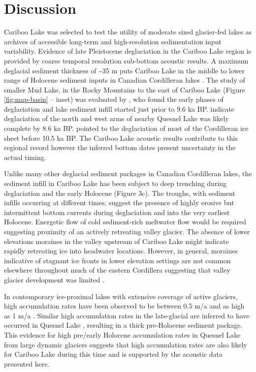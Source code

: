 \documentclass[Royal,times,doublespace,sageh]{sagej}
\begin{document}
\hypertarget{discussion}{%
\section{Discussion}\label{discussion}}

Cariboo Lake was selected to test the utility of moderate sized
glacier-fed lakes as archives of accessible long-term and
high-resolution sedimentation input variability. Evidence of late
Pleistocene deglaciation in the Cariboo Lake region is provided by
coarse temporal resolution sub-bottom acoustic results. A maximum
deglacial sediment thickness of \textasciitilde35 m puts Cariboo Lake in
the middle to lower range of Holocene sediment inputs in Canadian
Cordilleran lakes \citep[see detailed discussion in][]{Gilbert2012}. The
study of smaller Mud Lake, in the Rocky Mountains to the east of Cariboo
Lake (Figure \ref{fig:map-basin} -- inset) was evaluated by
\citet{Hodder2006b}, who found the early phases of deglaciation and lake
sediment infill started just prior to 9.6 ka BP. \citet{Gilbert2012}
indicate deglaciation of the north and west arms of nearby Quesnel Lake
was likely complete by 8.6 ka BP. \citet{Menounos2009b} pointed to the
deglaciation of most of the Cordilleran ice sheet before 10.5 ka BP. The
Cariboo Lake acoustic results contribute to this regional record however
the inferred bottom dates present uncertainty in the actual timing.

Unlike many other deglacial sediment packages in Canadian Cordilleran
lakes, the sediment infill in Cariboo Lake has been subject to deep
trenching during deglaciation and the early Holocene (Figure 3c). The
troughs, with sediment infills occurring at different times, suggest the
presence of highly erosive but intermittent bottom currents during
deglaciation and into the very earliest Holocene. Energetic flow of cold
sediment-rich meltwater flow would be required suggesting proximity of
an actively retreating valley glacier. The absence of lower elevations
moraines in the valley upstream of Cariboo Lake might indicate rapidly
retreating ice into headwater locations. However, in general, moraines
indicative of stagnant ice fronts in lower elevation settings are not
common elsewhere throughout much of the eastern Cordillera suggesting
that valley glacier development was limited \citep{Menounos2009b}.

In contemporary ice-proximal lakes with extensive coverage of active
glaciers, high accumulation rates have been observed to be between 0.5
m/a \citep{Crookshanks2008} and as high as 1 m/a \citep{Gilbert1997}.
Similar high accumulation rates in the late-glacial are inferred to have
occurred in Quesnel Lake \citep{Gilbert2012}, resulting in a thick
pre-Holocene sediment package. This evidence for high pre/early Holocene
accumulation rates in Quesnel Lake from large dynamic glaciers suggests
that high accumulation rates are also likely for Cariboo Lake during
this time and is supported by the acoustic data presented here.
\end{document}
